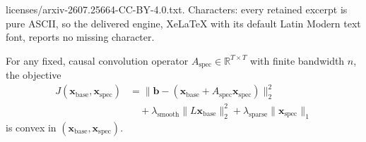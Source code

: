 \documentclass[10pt,a4paper]{amsart}
\newcommand{\Aspec}{A_{\text{spec}}}
\newcommand{\R}{\mathbb{R}}
\newcommand{\bvec}{\mathbf{b}}
\newcommand{\xbase}{\mathbf{x}_{\text{base}}}
\newcommand{\xspec}{\mathbf{x}_{\text{spec}}}
\begin{document}
licenses/arxiv-2607.25664-CC-BY-4.0.txt. Characters: every retained excerpt is pure ASCII, so the delivered engine, XeLaTeX with its default Latin Modern text font, reports no missing character.
\begin{proposition}[Convexity]
For any fixed, causal convolution operator $\Aspec \in \R^{T \times T}$ with finite bandwidth $n$, the objective
\begin{equation}
\begin{split}
J(\xbase, \xspec) &= \|\bvec - (\xbase + \Aspec \xspec)\|_2^2 \\
&\quad + \lambda_{\text{smooth}} \|L \xbase\|_2^2 + \lambda_{\text{sparse}} \|\xspec\|_1
\end{split}
\end{equation}
is convex in $(\xbase, \xspec)$.
\end{proposition}
\end{document}

